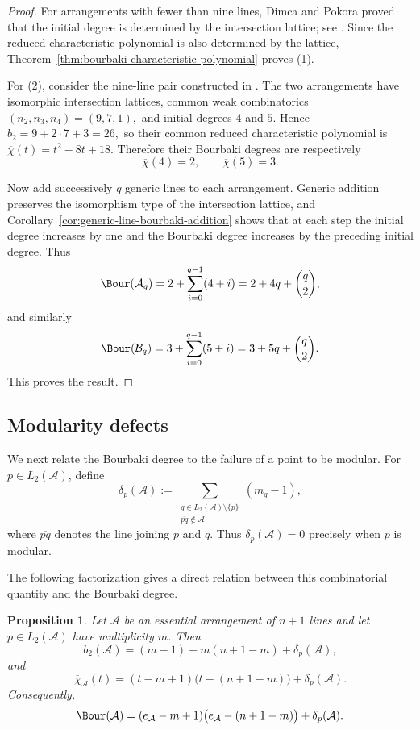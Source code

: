 \documentclass[11pt]{amsart}   %
\newtheorem{Proposition}[Theorem]{Proposition}
\theoremstyle{definition}
\def\A{{\mathcal A}}
\def\B{{\mathcal B}}
\begin{document}
\begin{proof}
For arrangements with fewer than nine lines, Dimca and Pokora proved that the initial degree is determined by the intersection lattice; see \cite{Dimca-Pokora-Ziegler}. Since the reduced characteristic polynomial is also determined by the lattice, Theorem~\ref{thm:bourbaki-characteristic-polynomial} proves (1).

For (2), consider the nine-line pair constructed in \cite{Dimca-Pokora-nine}. The two arrangements have isomorphic intersection lattices, common weak combinatorics $(n_2,n_3,n_4)=(9,7,1),$ and initial degrees $4$ and $5$. Hence $b_2=9+2\cdot7+3=26,$ so their common reduced characteristic polynomial is $\overline{\chi}(t)=t^2-8t+18.$ Therefore their Bourbaki degrees are respectively
\[
\overline{\chi}(4)=2,
\qquad
\overline{\chi}(5)=3.
\]

Now add successively $q$ generic lines to each arrangement. Generic addition preserves the isomorphism type of the intersection lattice, and Corollary~\ref{cor:generic-line-bourbaki-addition} shows that at each step the initial degree increases by one and the Bourbaki degree increases by the preceding initial degree. Thus
\[
\Bour(\A_q)
=
2+\sum_{i=0}^{q-1}(4+i)
=
2+4q+\binom q2,
\]
and similarly
\[
\Bour(\B_q)
=
3+\sum_{i=0}^{q-1}(5+i)
=
3+5q+\binom q2.
\]
This proves the result.
\end{proof}

\subsection{Modularity defects}
\label{subsec:modularity-defects}

We next relate the Bourbaki degree to the failure of a point to be modular. For $p\in L_2(\A)$, define
\[
\delta_p(\A) :=
\sum_{\substack{
q\in L_2(\A)\setminus\{p\}\\
\overline{pq}\notin\A}}
(m_q-1),
\]
where $\overline{pq}$ denotes the line joining $p$ and $q$. Thus $\delta_p(\A)=0$ precisely when $p$ is modular.

The following factorization gives a direct relation between this combinatorial quantity and the Bourbaki degree.

\begin{Proposition}
\label{prop:characteristic-polynomial-modularity-defect}
Let $\A$ be an essential arrangement of $n+1$ lines and let $p\in L_2(\A)$ have multiplicity $m$. Then
\[
b_2(\A)
=
(m-1)+m(n+1-m)+\delta_p(\A),
\]
and
\begin{equation}
\label{eq:characteristic-modularity-defect}
\overline{\chi}_\A(t)
=
(t-m+1)\bigl(t-(n+1-m)\bigr)+\delta_p(\A).
\end{equation}
Consequently,
\begin{equation}
\label{eq:bourbaki-modularity-defect}
\Bour(\A)
=
(e_\A-m+1)\bigl(e_\A-(n+1-m)\bigr)+\delta_p(\A).
\end{equation}
\end{Proposition}
\end{document}
